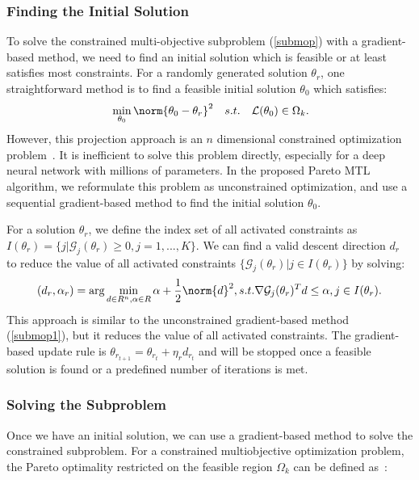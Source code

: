 \subsubsection{Finding the Initial Solution}
To solve the constrained multi-objective subproblem (\ref{submop}) with a gradient-based method, we need to find an initial solution which is feasible or at least satisfies most constraints. For a randomly generated solution $\theta_r$, one straightforward method is to find a feasible initial solution $\theta_0$ which satisfies:
\begin{eqnarray}
    \label{init_sol}
    \begin{aligned}
        & \min_{\theta_0} \norm{\theta_0 - \theta_r}^2
        &s.t.~~~ \mathcal{L}(\theta_0) \in \Omega_k.
    \end{aligned}
\end{eqnarray}
However, this projection approach is an $n$ dimensional constrained optimization problem~\cite{gebken2017descent}. It is inefficient to solve this problem directly, especially for a deep neural network with millions of parameters. In the proposed Pareto MTL algorithm, we reformulate this problem as unconstrained optimization, and use a sequential gradient-based method to find the initial solution $\theta_0$.

For a solution $\theta_{r}$, we define the index set of all activated constraints as $I(\theta_{r}) = \{j |\mathcal{G}_j(\theta_{r}) \geq 0, j = 1,...,K \}$. We can find a valid descent direction $d_{r}$ to reduce the value of all activated constraints $\{\mathcal{G}_j(\theta_{r})|j \in I(\theta_{r})\}$ by solving:
\begin{eqnarray}
    \label{submop1_feasible}
         (d_{r},\alpha_{r}) = \text{arg} \min_{d\in R^n,\alpha \in R} \alpha + \frac{1}{2} \norm{d}^2, s.t.\nabla \mathcal{G}_j(\theta_{r})^Td \leq \alpha, j \in I(\theta_{r}).
\end{eqnarray}
This approach is similar to the unconstrained gradient-based method (\ref{submop1}), but it reduces the value of all activated constraints. The gradient-based update rule is $\theta_{r_{t+1}} = \theta_{r_t} + \eta_r d_{r_t}$ and will be stopped once a feasible solution is found  or a predefined number of iterations is met.

\subsubsection{Solving the Subproblem}
Once we have an initial solution, we can use a gradient-based method to solve the constrained subproblem. For a constrained multiobjective optimization problem, the Pareto optimality restricted on the feasible region $\Omega_k$ can be defined as~\cite{fliege2000steepest}:

